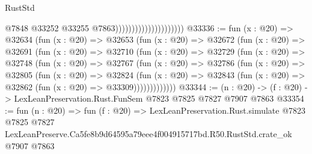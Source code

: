 \begin{lexlean}{RustStd}
\begin{coremodule}
                                              @7848
                                              @33252
                                              @33255
                                              @7863)))))))))))))))))))))
@33336 := fun (x : @20) =>
  @32634
    (fun (x : @20) =>
    @32653
      (fun (x : @20) =>
      @32672
        (fun (x : @20) =>
        @32691
          (fun (x : @20) =>
          @32710
            (fun (x : @20) =>
            @32729
              (fun (x : @20) =>
              @32748
                (fun (x : @20) =>
                @32767
                  (fun (x : @20) =>
                  @32786
                    (fun (x : @20) =>
                    @32805
                      (fun (x : @20) =>
                      @32824
                        (fun (x : @20) =>
                        @32843 (fun (x : @20) => @32862 (fun (x : @20) => @33309)))))))))))))
@33344 := (n : @20) -> (f : @20) -> LexLeanPreservation.Rust.FunSem @7823 @7825 @7827 @7907 @7863
@33354 := fun (n : @20) =>
  fun (f : @20) =>
  LexLeanPreservation.Rust.simulate
    @7823
    @7825
    @7827
    LexLeanPreserve.Ca5fe8b9d64595a79eee4f004915717bd.R50.RustStd.crate_ok
    @7907
    @7863
\end{coremodule}
\end{lexlean}
